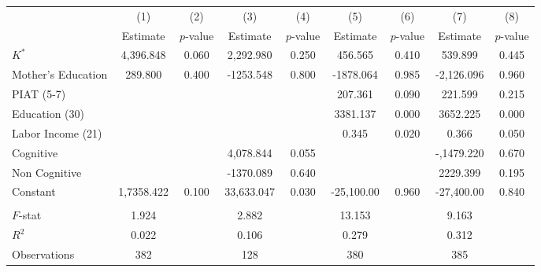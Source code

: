 \begin{tabular}{lcccccccc} \toprule
 & (1) & (2) & (3) & (4) & (5) & (6) & (7) & (8) \\
 & Estimate  & $p$-value  & Estimate  & $p$-value  & Estimate  & $p$-value  & Estimate  & $p$-value  \\  \midrule
$K^\ast$ &  4,396.848 &     0.060 &  2,292.980 &     0.250 &   456.565 &     0.410 &   539.899 &     0.445 \\
Mother's Education &   289.800 &     0.400 & -1253.548 &     0.800 & -1878.064 &     0.985 & -2,126.096 &     0.960 \\
PIAT (5-7) &         &         &         &         &   207.361 &     0.090 &   221.599 &     0.215 \\
Education (30) &         &         &         &         &  3381.137 &     0.000 &  3652.225 &     0.000 \\
Labor Income (21) &         &         &         &         &     0.345 &     0.020 &     0.366 &     0.050 \\
Cognitive &         &         &  4,078.844 &     0.055 &         &         & -,1479.220 &     0.670 \\
Non Cognitive &         &         & -1370.089 &     0.640 &         &         &  2229.399 &     0.195 \\
Constant & 1,7358.422 &     0.100 & 33,633.047 &     0.030 & -25,100.00 &     0.960 & -27,400.00 &     0.840 \\  \\ \midrule
$F$-stat &     1.924 &         &     2.882 &         &    13.153 &         &     9.163 &        \\
$R^2$ &     0.022 &         &     0.106 &         &     0.279 &         &     0.312 &        \\
Observations &   382 &         &   128 &         &   380 &         &   385 &        \\
\bottomrule \end{tabular}
